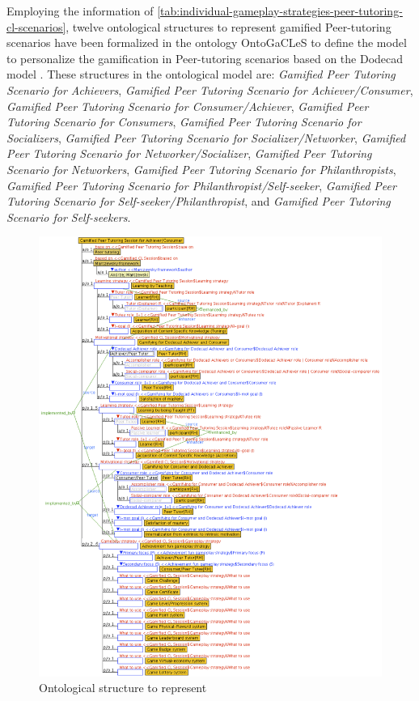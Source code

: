 Employing the information of \autoref{tab:individual-gameplay-strategies-peer-tutoring-cl-scenarios}, twelve ontological structures to represent gamified Peer-tutoring scenarios have been formalized in the ontology OntoGaCLeS to define the model to personalize the gamification in Peer-tutoring scenarios based on the Dodecad model \cite{Marczewski2015b}.
These structures in the ontological model are:
\emph{Gamified Peer Tutoring Scenario for Achievers},
\emph{Gamified Peer Tutoring Scenario for Achiever/Consumer},
\emph{Gamified Peer Tutoring Scenario for Consumer/Achiever},
\emph{Gamified Peer Tutoring Scenario for Consumers},
\emph{Gamified Peer Tutoring Scenario for Socializers},
\emph{Gamified Peer Tutoring Scenario for Socializer/Networker},
\emph{Gamified Peer Tutoring Scenario for Networker/Socializer},
\emph{Gamified Peer Tutoring Scenario for Networkers},
\emph{Gamified Peer Tutoring Scenario for Philanthropists},
\emph{Gamified Peer Tutoring Scenario for Philanthropist/Self-seeker},
\emph{Gamified Peer Tutoring Scenario for Self-seeker/Philanthropist}, and
\emph{Gamified Peer Tutoring Scenario for Self-seekers}. 


\begin{figure}[!htbp]
 \caption[Ontological structures to represent a gamified CL scenario for dodecad socializers]{Ontological structure to represent }
 \label{fig:ontological-structure-gamified-peer-tutoring-scenario-achiever-consumer}
 \centering
  \includegraphics[width=1\textwidth]{images/chap-ontogacles1/ontological-structure-gamified-peer-tutoring-scenario-achiever-consumer.png} 
 \fautor
\end{figure}

